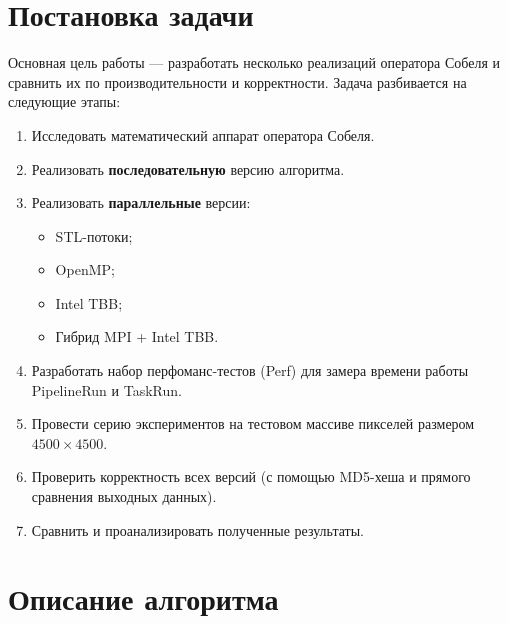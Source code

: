 \documentclass[12pt]{article}
\begin{document}
\section{Постановка задачи}

Основная цель работы — разработать несколько реализаций оператора Собеля и сравнить их по производительности и корректности. Задача разбивается на следующие этапы:
\begin{enumerate}
    \item Исследовать математический аппарат оператора Собеля.
    \item Реализовать \textbf{последовательную} версию алгоритма.
    \item Реализовать \textbf{параллельные} версии:
    \begin{itemize}
        \item STL-потоки;
        \item OpenMP;
        \item Intel TBB;
        \item Гибрид MPI + Intel TBB.
    \end{itemize}
    \item Разработать набор перфоманс-тестов (Perf) для замера времени работы PipelineRun и TaskRun.
    \item Провести серию экспериментов на тестовом массиве пикселей размером $4500 \times 4500$.
    \item Проверить корректность всех версий (с помощью MD5-хеша и прямого сравнения выходных данных).
    \item Сравнить и проанализировать полученные результаты.
\end{enumerate}

\section{Описание алгоритма}
\end{document}
